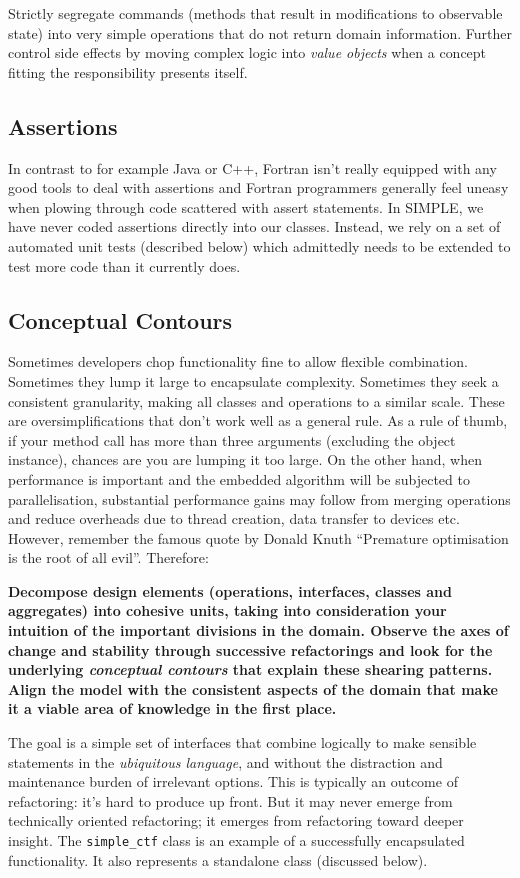 \documentclass[a4paper,11pt]{article}
\begin{document}
Strictly segregate commands (methods that result in modifications to observable state) into very simple operations that do not return domain information. Further control side effects by moving complex logic into \textit{value objects} when a concept fitting the responsibility presents itself.

\subsection{Assertions}
In contrast to for example Java or C++, Fortran isn't really equipped with any good tools to deal with assertions and Fortran programmers generally feel uneasy when plowing through code scattered with assert statements. In SIMPLE, we have never coded assertions directly into our classes. Instead, we rely on a set of automated unit tests (described below) which admittedly needs to be extended to test more code than it currently does. 

\subsection{Conceptual Contours}
Sometimes developers chop functionality fine to allow flexible combination. Sometimes they lump it large to encapsulate complexity. Sometimes they seek a consistent granularity, making all classes and operations to a similar scale. These are oversimplifications that don't work well as a general rule. As a rule of thumb, if your method call has more than three arguments (excluding the object instance), chances are you are lumping it too large. On the other hand, when performance is important and the embedded algorithm will be subjected to parallelisation, substantial performance gains may follow from merging operations and reduce overheads due to thread creation, data transfer to devices etc. However, remember the famous quote by Donald Knuth ``Premature optimisation is the root of all evil''. Therefore:

\textbf{Decompose design elements (operations, interfaces, classes and aggregates) into cohesive units, taking into consideration your intuition of the important divisions in the domain. Observe the axes of change and stability through successive refactorings and look for the underlying \textit{conceptual contours} that explain these shearing patterns. Align the model with the consistent aspects of the domain that make it a viable area of knowledge in the first place.}

The goal is a simple set of interfaces that combine logically to make sensible statements in the \textit{ubiquitous language}, and without the distraction and maintenance burden of irrelevant options. This is typically an outcome of refactoring: it's hard to produce up front. But it may never emerge from technically oriented refactoring; it emerges from refactoring toward deeper insight. The \texttt{simple\_ctf} class is an example of a successfully encapsulated functionality. It also represents a standalone class (discussed below).
\end{document}
